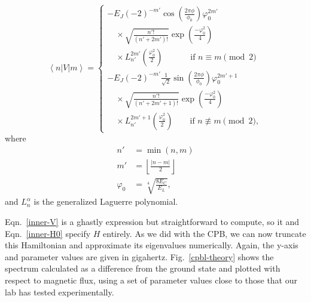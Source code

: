 \documentclass[twocolumn]{revtex4}
\newcommand{\innerp}[3]{\textstyle\left< #1 \left| #2 \right| #3 \right>}
\begin{document}
\begin{equation}
  \innerp{n}{V}{m} = \left\{\begin{array}{l}
      -E_J(-2)^{-m'}\cos\left(\frac{2\pi\phi}{\phi_0}\right)\varphi_0^{2m'}\\
      \quad{}\times \sqrt{\frac{n'!}{(n'+2m')!}}
      \exp\left(\frac{-\varphi_0^2}{4}\right)\\
      \quad{}\times L_{n'}^{2m'}\left(\frac{\varphi_0^2}{2}\right)
      \phantom{{}^{{}+1}}\qquad \text{if $n \equiv m \pmod{2}$}\\
      -E_J(-2)^{-m'}\frac{1}{\sqrt{2}}\sin
      \left(\frac{2\pi\phi}{\phi_0}\right)\varphi_0^{2m'+1}\\
      \quad{}\times \sqrt{\frac{n'!}{(n'+2m'+1)!}}
      \exp\left(\frac{-\varphi_0^2}{4}\right)\\
      \quad{}\times L_{n'}^{2m'+1}\left(\frac{\varphi_0^2}{2}\right)
      \qquad\text{if $n \not\equiv m \pmod{2}$},
\end{array}\right.
\label{inner-V}
\end{equation}
where
\begin{align}
  n'& =\min(n,m)\\
  m'&=\left\lfloor\frac{|n-m|}{2}\right\rfloor \\
  \varphi_0 &=\sqrt[4]{\frac{8E_C}{E_L}},
\end{align}
and $L_n^\alpha$ is the generalized Laguerre polynomial.

Eqn.~\eqref{inner-V} is a ghastly expression but straightforward to
compute, so it and Eqn.~\eqref{inner-H0} specify $H$ entirely. As we
did with the CPB, we can now truncate this Hamiltonian and approximate
its eigenvalues numerically. Again, the y-axis and parameter values
are given in gigahertz. Fig.~\ref{cpbl-theory} shows the spectrum
calculated as a difference from the ground state and plotted with
respect to magnetic flux, using a set of parameter values close to
those that our lab has tested experimentally.
\end{document}
